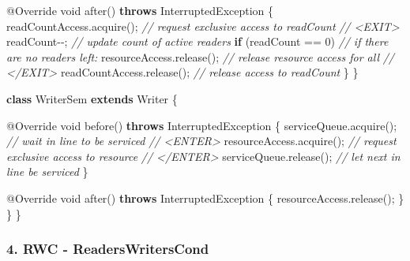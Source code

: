 \documentclass[
]{article}
\newenvironment{Shaded}{\begin{snugshade}}{\end{snugshade}}
\newcommand{\AttributeTok}[1]{\textcolor[rgb]{0.77,0.63,0.00}{#1}}
\newcommand{\BuiltInTok}[1]{#1}
\newcommand{\CommentTok}[1]{\textcolor[rgb]{0.56,0.35,0.01}{\textit{#1}}}
\newcommand{\DataTypeTok}[1]{\textcolor[rgb]{0.13,0.29,0.53}{#1}}
\newcommand{\DecValTok}[1]{\textcolor[rgb]{0.00,0.00,0.81}{#1}}
\newcommand{\FunctionTok}[1]{\textcolor[rgb]{0.00,0.00,0.00}{#1}}
\newcommand{\KeywordTok}[1]{\textcolor[rgb]{0.13,0.29,0.53}{\textbf{#1}}}
\newcommand{\NormalTok}[1]{#1}
\begin{document}
\begin{Shaded}
\begin{Highlighting}[]
        \AttributeTok{@Override}
        \DataTypeTok{void} \FunctionTok{after}\NormalTok{() }\KeywordTok{throws} \BuiltInTok{InterruptedException}\NormalTok{ \{}
\NormalTok{            readCountAccess.}\FunctionTok{acquire}\NormalTok{();        }\CommentTok{// request exclusive access to readCount}
            \CommentTok{// \textless{}EXIT\textgreater{}}
\NormalTok{            readCount{-}{-};                }\CommentTok{// update count of active readers}
            \KeywordTok{if}\NormalTok{ (readCount == }\DecValTok{0}\NormalTok{)         }\CommentTok{// if there are no readers left:}
\NormalTok{                resourceAccess.}\FunctionTok{release}\NormalTok{();     }\CommentTok{// release resource access for all}
            \CommentTok{// \textless{}/EXIT\textgreater{}}
\NormalTok{            readCountAccess.}\FunctionTok{release}\NormalTok{();        }\CommentTok{// release access to readCount}
\NormalTok{        \}}
\NormalTok{    \}}

    \KeywordTok{class}\NormalTok{ WriterSem }\KeywordTok{extends} \BuiltInTok{Writer}\NormalTok{ \{}

        \AttributeTok{@Override}
        \DataTypeTok{void} \FunctionTok{before}\NormalTok{() }\KeywordTok{throws} \BuiltInTok{InterruptedException}\NormalTok{ \{}
\NormalTok{            serviceQueue.}\FunctionTok{acquire}\NormalTok{();           }\CommentTok{// wait in line to be serviced}
            \CommentTok{// \textless{}ENTER\textgreater{}}
\NormalTok{            resourceAccess.}\FunctionTok{acquire}\NormalTok{();         }\CommentTok{// request exclusive access to resource}
            \CommentTok{// \textless{}/ENTER\textgreater{}}
\NormalTok{            serviceQueue.}\FunctionTok{release}\NormalTok{();           }\CommentTok{// let next in line be serviced}
\NormalTok{        \}}

        \AttributeTok{@Override}
        \DataTypeTok{void} \FunctionTok{after}\NormalTok{() }\KeywordTok{throws} \BuiltInTok{InterruptedException}\NormalTok{ \{}
\NormalTok{            resourceAccess.}\FunctionTok{release}\NormalTok{();}
\NormalTok{        \}}
\NormalTok{    \}}
\NormalTok{\}}
\end{Highlighting}
\end{Shaded}

\hypertarget{rwc---readerswriterscond}{%
\subsubsection{4. RWC -
ReadersWritersCond}\label{rwc---readerswriterscond}}
\end{document}

